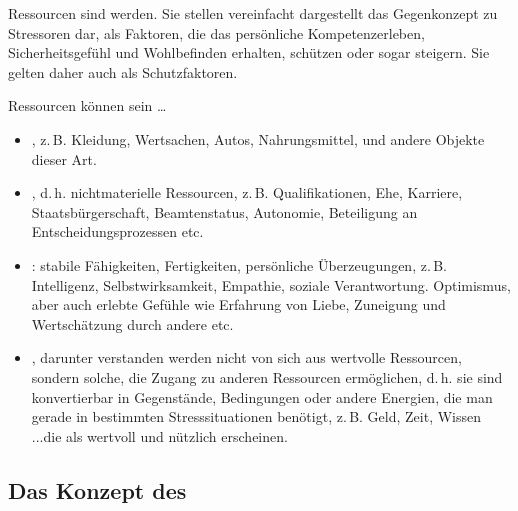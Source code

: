 
{Ressourcen sind  werden. Sie stellen
vereinfacht dargestellt das Gegenkonzept zu Stressoren dar,
als Faktoren, die das persönliche Kompetenzerleben,
Sicherheitsgefühl und Wohlbefinden erhalten, schützen oder
sogar steigern. Sie gelten daher auch als Schutzfaktoren.


Ressourcen können sein \ldots
\begin{itemize}
  \item {}, z.\,B. Kleidung, Wertsachen, Autos,
  Nahrungsmittel, und andere Objekte dieser Art.
  \item {}, d.\,h. nichtmaterielle Ressourcen,
  z.\,B. Qualifikationen, Ehe, Karriere, Staatsbürgerschaft,
  Beamtenstatus, Autonomie, Beteiligung an
  Entscheidungsprozessen etc.
  \item {}: stabile Fähigkeiten,
  Fertigkeiten, persönliche Überzeugungen, z.\,B. Intelligenz,
  Selbstwirksamkeit, Empathie, soziale Verantwortung.
  Optimismus, aber auch erlebte Gefühle wie Erfahrung von
  Liebe, Zuneigung und Wertschätzung durch andere etc.
  \item {}, darunter verstanden werden nicht von
  sich aus wertvolle Ressourcen, sondern solche, die Zugang zu
  anderen Ressourcen ermöglichen, d.\,h. sie sind konvertierbar
  in Gegenstände, Bedingungen oder andere Energien, die man
  gerade in bestimmten Stresssituationen benötigt, z.\,B.
  Geld, Zeit, Wissen
  ...die als wertvoll und nützlich erscheinen.
\end{itemize}}
{}
{}
{}
{}




\subsection{Das Konzept des }

